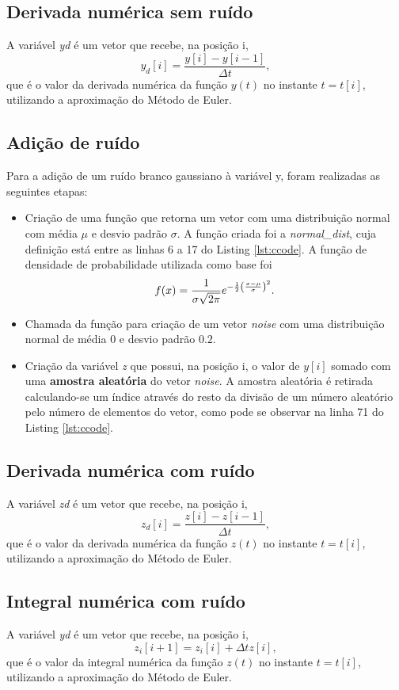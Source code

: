 \documentclass[
	12pt,				%
	openany,			%
	twoside,			%
	a4paper,			%
	english,			%
	french,				%
	spanish,			%
	brazil,				%
	]{abntex2}
\begin{document}
\subsection{Derivada numérica sem ruído}
A variável \emph{yd} é um vetor que recebe, na posição i, 
$$y_d[i] = \frac{y[i] - y[i-1]}{\Delta t},$$
que é o valor da derivada numérica da função $y(t)$ no instante $t = t[i]$, utilizando a aproximação do Método de Euler.

\subsection{Adição de ruído}
Para a adição de um ruído branco gaussiano à variável y, foram realizadas as seguintes etapas:
\begin{itemize}
    \item Criação de uma função que retorna um vetor com uma distribuição normal com média $\mu$ e desvio padrão $\sigma$. A função criada foi a \emph{normal\_dist}, cuja definição está entre as linhas 6 a 17 do Listing \ref{lst:ccode}. A função de densidade de probabilidade utilizada como base \cite{normalwiki} foi $$\large f(x) = \frac{1}{\sigma \sqrt{2\pi}}e^{-\frac{1}{2}\left(\frac{x - \mu}{\sigma}\right)^2}.$$
    \item Chamada da função para criação de um vetor \emph{noise} com uma distribuição normal de média $0$ e desvio padrão $0.2$. 
    \item Criação da variável \emph{z} que possui, na posição i, o valor de $y[i]$ somado com uma \textbf{amostra aleatória} do vetor \emph{noise}. A amostra aleatória é retirada calculando-se um índice através do resto da divisão de um número aleatório pelo número de elementos do vetor, como pode se observar na linha 71 do Listing \ref{lst:ccode}. 
\end{itemize}

\subsection{Derivada numérica com ruído}
A variável \emph{zd} é um vetor que recebe, na posição i,
$$z_d[i] = \frac{z[i] - z[i-1]}{\Delta t},$$
que é o valor da derivada numérica da função $z(t)$ no instante $t = t[i]$, utilizando a aproximação do Método de Euler.

\subsection{Integral numérica com ruído}
A variável \emph{yd} é um vetor que recebe, na posição i,
$$z_i[i + 1] = z_i[i] + \Delta t z[i],$$
que é o valor da integral numérica da função $z(t)$ no instante $t = t[i]$, utilizando a aproximação do Método de Euler.
\end{document}
